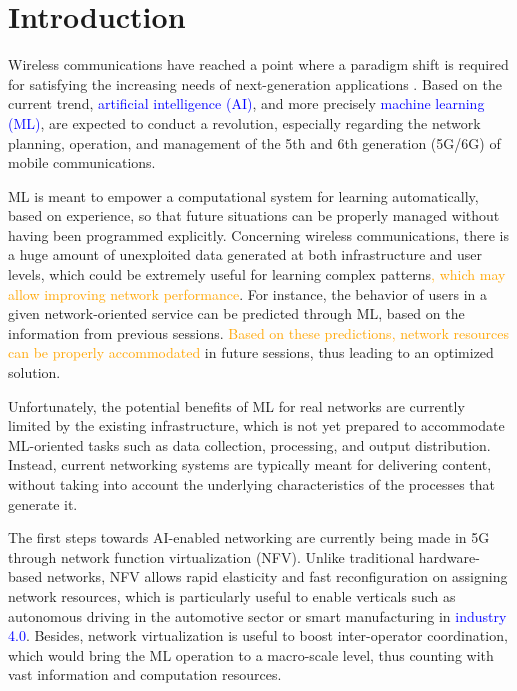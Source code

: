 \documentclass[journal]{IEEEtran}
\begin{document}
\section{Introduction}
% 
% 
% 
% 
Wireless communications have reached a point where a paradigm shift is required for satisfying the increasing needs of next-generation applications \cite{osseiran2014scenarios}. Based on the current trend, \textcolor{blue}{artificial intelligence (AI)}, and more precisely \textcolor{blue}{machine learning (ML)}, are expected to conduct a revolution, especially regarding the network planning, operation, and management of the 5th and 6th generation (5G/6G) of mobile communications. 

ML is meant to empower a computational system for learning automatically, based on experience, so that future situations can be properly managed without having been programmed explicitly. Concerning wireless communications, there is a huge amount of unexploited data generated at both infrastructure and user levels, which could be extremely useful for learning complex patterns\textcolor{orange}{, which may allow improving network performance}. For instance, the behavior of users in a given network-oriented service can be predicted through ML, based on the information from previous sessions. \textcolor{orange}{Based on these predictions, network resources can be properly accommodated} in future sessions, thus leading to an optimized solution.

Unfortunately, the potential benefits of ML for real networks are currently limited by the existing infrastructure, which is not yet prepared to accommodate ML-oriented tasks such as data collection, processing, and output distribution. Instead, current networking systems are typically meant for delivering content, without taking into account the underlying characteristics of the processes that generate it. 

The first steps towards AI-enabled networking are currently being made in 5G through network function virtualization (NFV). Unlike traditional hardware-based networks, NFV allows rapid elasticity and fast reconfiguration on assigning network resources, which is particularly useful to enable verticals such as autonomous driving in the automotive sector or smart manufacturing in \textcolor{blue}{industry 4.0}. Besides, network virtualization is useful to boost inter-operator coordination, which would bring the ML operation to a macro-scale level, thus counting with vast information and computation resources. 
\end{document}
